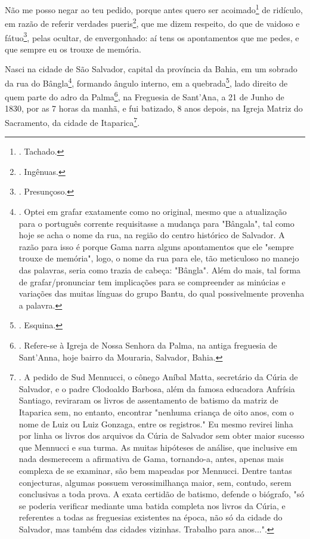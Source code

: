 Não me posso negar ao teu pedido, porque antes quero ser
acoimado\footnote{. Tachado.} de ridículo, em razão de referir verdades
pueris\footnote{. Ingênuas.}, que me dizem respeito, do que de vaidoso e
fátuo\footnote{. Presunçoso.}, pelas ocultar, de envergonhado: aí tens
os apontamentos que me pedes, e que sempre eu os trouxe de memória.

Nasci na cidade de São Salvador, capital da província da Bahia, em um
sobrado da rua do Bângla\footnote{. Optei em grafar exatamente como no
  original, mesmo que a atualização para o português corrente
  requisitasse a mudança para "Bângala", tal como hoje se acha o nome da
  rua, na região do centro histórico de Salvador. A razão para isso é
  porque Gama narra alguns apontamentos que ele "sempre trouxe de
  memória", logo, o nome da rua para ele, tão meticuloso no manejo das
  palavras, seria como trazia de cabeça: "Bângla". Além do mais, tal
  forma de grafar/pronunciar tem implicações para se compreender as
  minúcias e variações das muitas línguas do grupo Bantu, do qual
  possivelmente provenha a palavra.}, formando ângulo interno, em a
quebrada\footnote{. Esquina.}, lado direito de quem parte do adro da
Palma\footnote{. Refere-se à Igreja de Nossa Senhora da Palma, na antiga
  freguesia de Sant'Anna, hoje bairro da Mouraria, Salvador, Bahia.}, na
Freguesia de Sant'Ana, a 21 de Junho de 1830, por as 7 horas da manhã, e
fui batizado, 8 anos depois, na Igreja Matriz do Sacramento, da cidade
de Itaparica\footnote{. A pedido de Sud Mennucci, o cônego Aníbal Matta,
  secretário da Cúria de Salvador, e o padre Clodoaldo Barbosa, além da
  famosa educadora Anfrísia Santiago, reviraram os livros de
  assentamento de batismo da matriz de Itaparica sem, no entanto,
  encontrar "nenhuma criança de oito anos, com o nome de Luiz ou Luiz
  Gonzaga, entre os registros." Eu mesmo revirei linha por linha os
  livros dos arquivos da Cúria de Salvador sem obter maior sucesso que
  Mennucci e sua turma. As muitas hipóteses de análise, que inclusive em
  nada desmerecem a afirmativa de Gama, tornando-a, antes, apenas mais
  complexa de se examinar, são bem mapeadas por Mennucci. Dentre tantas
  conjecturas, algumas possuem verossimilhança maior, sem, contudo,
  serem conclusivas a toda prova. A exata certidão de batismo, defende o
  biógrafo, "só se poderia verificar mediante uma batida completa nos
  livros da Cúria, e referentes a todas as freguesias existentes na
  época, não só da cidade do Salvador, mas também das cidades vizinhas.
  Trabalho para anos...".}.

